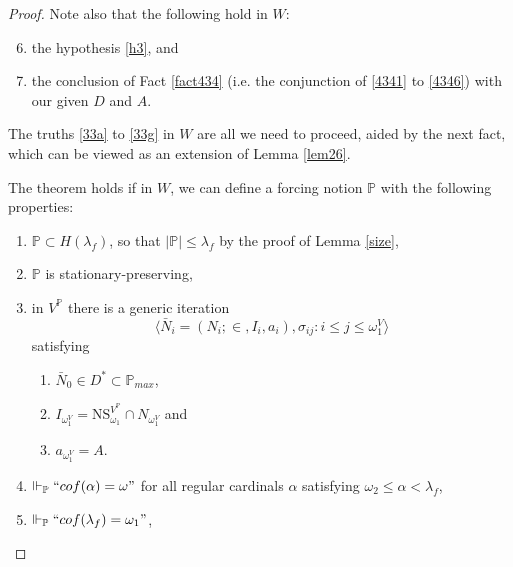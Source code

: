 \documentclass[12pt]{article}
\numberwithin{equation}{section}
\begin{document}
\begin{proof}
Note also that the following hold in $W$:
\begin{enumerate}[label=(\Alph*)]
    \setcounter{enumi}{5}
    \item the hypothesis \ref{h3}, and
    \item\label{33g} the conclusion of Fact \ref{fact434} (i.e. the conjunction of \ref{4341} to \ref{4346}) with our given $D$ and $A$. 
\end{enumerate}

The truths \ref{33a} to \ref{33g} in $W$ are all we need to proceed, aided by the next fact, which can be viewed as an extension of Lemma \ref{lem26}.

\begin{fact}\label{fact436}
The theorem holds if in $W$, we can define a forcing notion $\mathbb{P}$ with the following properties: 
\begin{enumerate}[label=(K\arabic*), leftmargin=40pt]
    \item\label{K1} $\mathbb{P} \subset H(\lambda_f)$, so that $|\mathbb{P}| \leq \lambda_f$ by the proof of Lemma \ref{size},
    \item\label{K2} $\mathbb{P}$ is stationary-preserving, 
    \item\label{K3} in $V^{\mathbb{P}}$ there is a generic iteration $$\langle \bar{N}_i = (N_i; \in, I_i, a_i), \sigma_{ij} : i \leq j \leq \omega_1^V \rangle$$ satisfying 
    \begin{enumerate}[label=(\arabic*), leftmargin=40pt]
        \item\label{k31} $\bar{N}_0 \in D^* \subset \mathbb{P}_{max}$,
        \item\label{k32} $I_{\omega_1^V} = \mathrm{NS}_{\omega_1}^{V^{\mathbb{P}}} \cap N_{\omega_1^V}$ and
        \item\label{k33} $a_{\omega_1^V} = A$.
    \end{enumerate} 
    \item\label{K4} $\Vdash_{\mathbb{P}} ``cof(\alpha) = \omega"$ for all regular cardinals $\alpha$ satisfying $\omega_2 \leq \alpha < \lambda_f$,
    \item\label{K5} $\Vdash_{\mathbb{P}} ``cof(\lambda_f) = \omega_1"$,
\end{enumerate}
\end{fact}


\end{proof}
\end{document}
